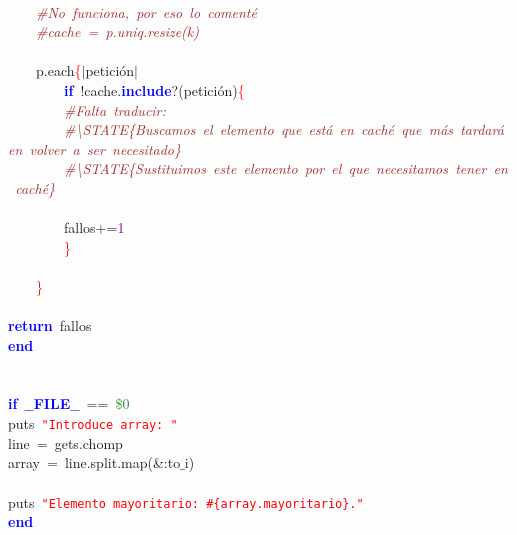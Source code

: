 \mbox{} \\
\mbox{}\ \ \ \ \textit{\textcolor{Brown}{\#No\ funciona,\ por\ eso\ lo\ comenté}} \\
\mbox{}\ \ \ \ \textit{\textcolor{Brown}{\#cache\ =\ p.uniq.resize(k)}} \\
\mbox{} \\
\mbox{}\ \ \ \ p\textcolor{BrickRed}{.}each\textcolor{Red}{\{}\textcolor{BrickRed}{$|$}petición\textcolor{BrickRed}{$|$}\  \\
\mbox{}\ \ \ \ \ \ \ \ \textbf{\textcolor{Blue}{if}}\ \textcolor{BrickRed}{!}cache\textcolor{BrickRed}{.}\textbf{\textcolor{Blue}{include}}\textcolor{BrickRed}{?(}petición\textcolor{BrickRed}{)}\textcolor{Red}{\{} \\
\mbox{}\ \ \ \ \ \ \ \ \textit{\textcolor{Brown}{\#Falta\ traducir:}} \\
\mbox{}\ \ \ \ \ \ \ \ \textit{\textcolor{Brown}{\#\textbackslash{}STATE\{Buscamos\ el\ elemento\ que\ está\ en\ caché\ que\ más\ tardará\ en\ volver\ a\ ser\ necesitado\}}} \\
\mbox{}\ \ \ \ \ \ \ \ \textit{\textcolor{Brown}{\#\textbackslash{}STATE\{Sustituimos\ este\ elemento\ por\ el\ que\ necesitamos\ tener\ en\ caché\}}} \\
\mbox{} \\
\mbox{}\ \ \ \ \ \ \ \ fallos\textcolor{BrickRed}{+=}\textcolor{Purple}{1} \\
\mbox{}\ \ \ \ \ \ \ \ \textcolor{Red}{\}} \\
\mbox{} \\
\mbox{}\ \ \ \ \textcolor{Red}{\}} \\
\mbox{} \\
\mbox{}\textbf{\textcolor{Blue}{return}}\ fallos \\
\mbox{}\textbf{\textcolor{Blue}{end}} \\
\mbox{} \\
\mbox{} \\
\mbox{}\textbf{\textcolor{Blue}{if}}\ \textbf{\textcolor{Blue}{$\_$$\_$FILE$\_$$\_$}}\ \textcolor{BrickRed}{==}\ \textcolor{ForestGreen}{\$0} \\
\mbox{}puts\ \texttt{\textcolor{Red}{"{}Introduce\ array:\ "{}}} \\
\mbox{}line\ \textcolor{BrickRed}{=}\ gets\textcolor{BrickRed}{.}chomp \\
\mbox{}array\ \textcolor{BrickRed}{=}\ line\textcolor{BrickRed}{.}split\textcolor{BrickRed}{.}map\textcolor{BrickRed}{(\&:}to$\_$i\textcolor{BrickRed}{)} \\
\mbox{} \\
\mbox{}puts\ \texttt{\textcolor{Red}{"{}Elemento\ mayoritario:\ \#\{array.mayoritario\}."{}}} \\
\mbox{}\textbf{\textcolor{Blue}{end}} \\
\mbox{}
